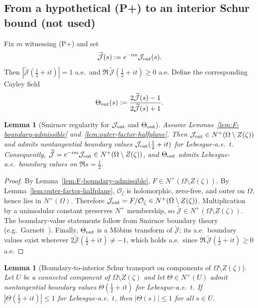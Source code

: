 \documentclass[11pt]{amsart}
\newtheorem{lemma}[theorem]{Lemma}
\theoremstyle{definition}
\theoremstyle{remark}
\begin{document}
\subsection*{From a hypothetical (P+) to an interior Schur bound (not used)}
Fix $m$ witnessing \textup{(P+)} and set
\[
  \widetilde{\mathcal J}(s):=e^{-im}\mathcal J_{\rm out}(s).
\]
Then $|\widetilde{\mathcal J}(\tfrac12+it)|=1$ a.e.\ and $\Re\,\widetilde{\mathcal J}(\tfrac12+it)\ge 0$ a.e.
Define the corresponding Cayley field
\[
  \Theta_{\rm out}(s):=\frac{2\widetilde{\mathcal J}(s)-1}{2\widetilde{\mathcal J}(s)+1}.
\]
\begin{lemma}[Smirnov regularity for $\mathcal J_{\rm out}$ and $\Theta_{\rm out}$]\label{lem:smirnov-regularity}
Assume Lemmas~\ref{lem:F-boundary-admissible} and~\ref{lem:outer-factor-halfplane}.
Then $\mathcal J_{\rm out}\in N^+(\Omega\setminus Z(\zeta))$ and admits nontangential boundary values
$\mathcal J_{\rm out}(\tfrac12+it)$ for Lebesgue-a.e.\ $t$.
Consequently, $\widetilde{\mathcal J}=e^{-im}\mathcal J_{\rm out}\in N^+(\Omega\setminus Z(\zeta))$, and
$\Theta_{\rm out}$ admits Lebesgue-a.e.\ boundary values on $\Re s=\tfrac12$.
\end{lemma}
\begin{proof}
By Lemma~\ref{lem:F-boundary-admissible}, $F\in N^+(\Omega\setminus Z(\zeta))$.
By Lemma~\ref{lem:outer-factor-halfplane}, $\mathcal O_\zeta$ is holomorphic, zero-free, and outer on $\Omega$, hence lies in $N^+(\Omega)$.
Therefore $\mathcal J_{\rm out}=F/\mathcal O_\zeta\in N^+(\Omega\setminus Z(\zeta))$.
Multiplication by a unimodular constant preserves $N^+$ membership, so $\widetilde{\mathcal J}\in N^+(\Omega\setminus Z(\zeta))$.
The boundary-value statements follow from Smirnov boundary theory (e.g.\ Garnett~\cite[Ch.~II]{GarnettBAF}).
Finally, $\Theta_{\rm out}$ is a Möbius transform of $\widetilde{\mathcal J}$; its a.e.\ boundary values exist wherever
$2\widetilde{\mathcal J}(\tfrac12+it)\neq -1$, which holds a.e.\ since $\Re\,\widetilde{\mathcal J}(\tfrac12+it)\ge 0$ a.e.
\end{proof}
\begin{lemma}[Boundary-to-interior Schur transport on components of $\Omega\setminus Z(\zeta)$]\label{lem:schur-transport-omega}
Let $U$ be a connected component of $\Omega\setminus Z(\zeta)$ and let $\Theta\in N^+(U)$ admit nontangential boundary values
$\Theta(\tfrac12+it)$ for Lebesgue-a.e.\ $t$.
If $|\Theta(\tfrac12+it)|\le 1$ for Lebesgue-a.e.\ $t$, then $|\Theta(s)|\le 1$ for all $s\in U$.
\end{lemma}
\end{document}
